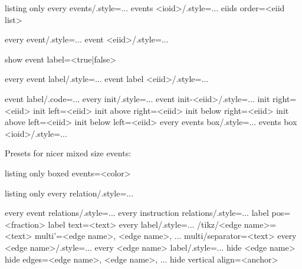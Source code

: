 \documentclass[a4paper]{article}
\begin{document}
\begin{tcblisting}{listing only}
every events/.style={...} %
events <ioid>/.style={...}
eiids order={<eiid list>}

every event/.style={...} %
event <eiid>/.style={...}

show event label=<true|false> %

every event label/.style={...} %
event label <eiid>/.style={...}

event label/.code={...} %
every init/.style={...} %
event init-<eiid>/.style={...}
init right=<eiid>
init left=<eiid>
init above right=<eiid>
init below right=<eiid>
init above left=<eiid>
init below left=<eiid>
every events box/.style={...} %
events box <ioid>/.style={...}
\end{tcblisting}

Presets for nicer mixed size events:
\begin{tcblisting}{listing only}
boxed events=<color> %
\end{tcblisting}

\begin{tcblisting}{listing only}
every relation/.style={...}

every event relations/.style={...}
every instruction relations/.style={...}
label pos=<fraction> %
label text=<text> %
every label/.style={...}
/tikz/<edge name>=<text> %
multi'={<edge name>, <edge name>, ...} %
multi/separator={<text>} %
every <edge name>/.style={...}
every <edge name> label/.style={...}
hide <edge name>
hide edges={<edge name>, <edge name>, ...} %
hide %
vertical align=<anchor> %

\end{tcblisting}
\end{document}
